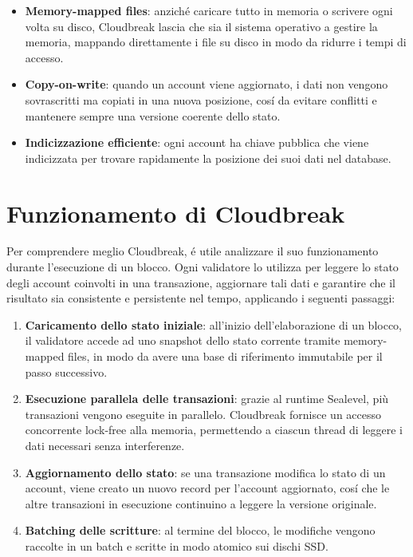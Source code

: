 \documentclass[a4paper,12pt]{report}
\begin{document}
	\begin{itemize}
		\item \textbf{Memory-mapped files}: anziché caricare tutto in memoria o scrivere ogni volta su disco, Cloudbreak lascia che sia il sistema operativo a gestire la memoria, mappando direttamente i file su disco in modo da ridurre i tempi di accesso.
		\item \textbf{Copy-on-write}: quando un account viene aggiornato, i dati non vengono sovrascritti ma copiati in una nuova posizione, cosí da evitare conflitti e mantenere sempre una versione coerente dello stato.
		\item \textbf{Indicizzazione efficiente}: ogni account ha chiave pubblica che viene indicizzata per trovare rapidamente la posizione dei suoi dati nel database.
	\end{itemize}
	
	\section{Funzionamento di Cloudbreak}
	Per comprendere meglio Cloudbreak, é utile analizzare il suo funzionamento durante l'esecuzione di un blocco. Ogni validatore lo utilizza per leggere lo stato degli account coinvolti in una transazione, aggiornare tali dati e garantire che il risultato sia consistente e persistente nel tempo, applicando i seguenti passaggi:
	\begin{enumerate}
		\item \textbf{Caricamento dello stato iniziale}: all'inizio dell'elaborazione di un blocco, il validatore accede ad uno snapshot dello stato corrente tramite memory-mapped files, in modo da avere una base di riferimento immutabile per il passo successivo.
		\item \textbf{Esecuzione parallela delle transazioni}: grazie al runtime Sealevel, più transazioni vengono eseguite in parallelo. Cloudbreak fornisce un accesso concorrente lock-free alla memoria, permettendo a ciascun thread di leggere i dati necessari senza interferenze.
		\item \textbf{Aggiornamento dello stato}: se una transazione modifica lo stato di un account, viene creato un nuovo record per l'account aggiornato, cosí che le altre transazioni in esecuzione continuino a leggere la versione originale.
		\item \textbf{Batching delle scritture}: al termine del blocco, le modifiche vengono raccolte in un batch e scritte in modo atomico sui dischi SSD.
	\end{enumerate}
	
\end{document}
